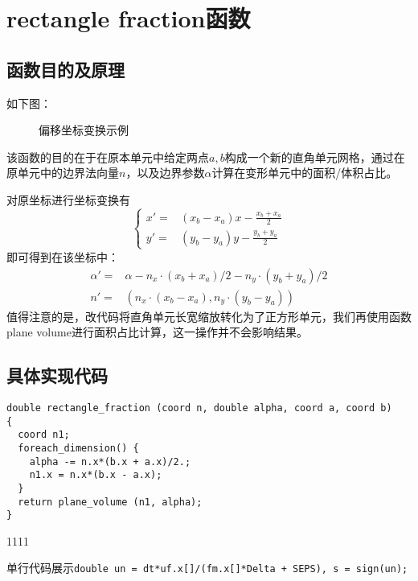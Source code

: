 \documentclass[lang=cn,11pt,a4paper]{elegantpaper}
\begin{document}
\section{rectangle fraction函数}
\subsection{函数目的及原理}
如下图：\par
\begin{figure}[htbp]
    \centering
    \begin{center}
    \end{center}
    \caption{偏移坐标变换示例}
    \label{fig:pianyi}
\end{figure}

该函数的目的在于在原本单元中给定两点$a,b$构成一个新的直角单元网格，通过在原单元中的边界法向量$n$，以及边界参数$\alpha$计算在变形单元中的面积/体积占比。\par
对原坐标进行坐标变换有
\begin{equation}
    \left\{
    \begin{array}{cc}
    x'=&(x_b-x_a)x-\frac{x_b+x_a}{2}\\
    y'=&(y_b-y_a)y-\frac{y_b+y_a}{2} 
    \end{array}
    \right.
\end{equation}
即可得到在该坐标中：
\begin{align}
\alpha ' =& \alpha - n_x\cdot (x_b+x_a)/2 - n_y\cdot (y_b+y_a)/2\\
n'=& (n_x\cdot (x_b-x_a),n_y\cdot (y_b-y_a))
\end{align}
值得注意的是，改代码将直角单元长宽缩放转化为了正方形单元，我们再使用函数plane volume进行面积占比计算，这一操作并不会影响结果。
\subsection{具体实现代码}
\begin{verbatim}
double rectangle_fraction (coord n, double alpha, coord a, coord b)
{
  coord n1;
  foreach_dimension() {
    alpha -= n.x*(b.x + a.x)/2.;
    n1.x = n.x*(b.x - a.x);
  }
  return plane_volume (n1, alpha);
}
\end{verbatim}
1111


单行代码展示\texttt{double un = dt*uf.x[]/(fm.x[]*Delta + SEPS), s = sign(un);} 
\end{document}
